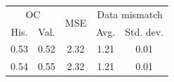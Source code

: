\begin{tabular}{ccccc}
\toprule
\multicolumn{2}{c}{OC} & 
\multirow{2}{*}{
    MSE
} & 
\multicolumn{2}{c}{Data mismatch} 
\\
His. & Val. &  & Avg. & Std. dev.
\\
\midrule
0.53 & 0.52 & 2.32 & 1.21 & 0.01 \\
0.54 & 0.55 & 2.32 & 1.21 & 0.01 \\
\bottomrule
\end{tabular}

